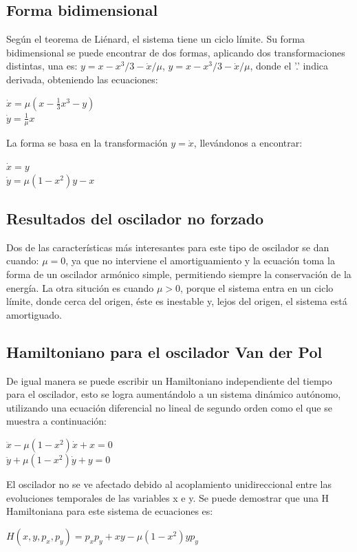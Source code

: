 \documentclass{article}
\begin{document}
\subsection{Forma bidimensional}
Según el teorema de Liénard, el sistema tiene un ciclo límite. Su forma bidimensional se puede encontrar de dos formas, aplicando dos transformaciones distintas, una es: $ y=x-x^{3}/3-{\dot {x}}/\mu$, $y=x-x^{3}/3-{\dot {x}}/\mu $, donde el '.' indica derivada, obteniendo las ecuaciones:
\begin{center}
${\dot {x}}=\mu \left(x-{\frac {1}{3}}x^{3}-y\right)$\\
${\dot {y}}={\frac {1}{\mu }}x$
\end{center}
La forma se basa en la transformación $y = \dot x $, llevándonos a encontrar:
\begin{center}
$\dot x = y$\\
$\dot {y}=\mu (1-x^{2})y-x$
\end{center}

\subsection{Resultados del oscilador no forzado}
Dos de las características más interesantes para este tipo de oscilador se dan cuando: $\mu=0$, ya que no interviene el amortiguamiento y la ecuación toma la forma de un oscilador armónico simple, permitiendo siempre la conservación de la energía. La otra situción es cuando $\mu>0$, porque el sistema entra en un ciclo límite, donde cerca del origen, éste es inestable y, lejos del origen, el sistema está amortiguado.

\subsection{Hamiltoniano para el oscilador Van der Pol}
De igual manera se puede escribir un Hamiltoniano independiente del tiempo para el oscilador, esto se logra aumentándolo a un sistema dinámico autónomo, utilizando una ecuación diferencial no lineal de segundo orden como el que se muestra a continuación:
\begin{center}
${\ddot {x}}-\mu (1-x^{2}){\dot {x}}+x=0$\\
${\ddot {y}}+\mu (1-x^{2}){\dot {y}}+y=0$
\end{center}

El oscilador no se ve afectado debido al acoplamiento unidireccional entre las evoluciones temporales de las variables x e y.  Se puede demostrar que una H Hamiltoniana para este sistema de ecuaciones es:
\begin{center}
$H(x,y,p_{x},p_{y})=p_{x}p_{y}+xy-\mu (1-x^{2})yp_{y}$
\end{center}
\end{document}
